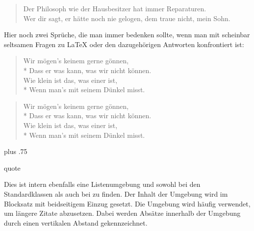 \begin{Example}
\begin{lstcode}
  \begin{verse}
    Der Philosoph wie der Hausbesitzer
    hat immer Reparaturen.\\
    \bigskip
    Wer dir sagt, er hätte noch nie
    gelogen, dem traue nicht, mein Sohn.
  \end{verse}
\end{lstcode}
      \iftrue%
        Hier noch zwei Sprüche, die man immer bedenken sollte, wenn man mit
        scheinbar seltsamen Fragen zu {\LaTeX} oder den dazugehörigen Antworten
        konfrontiert ist:
\begin{lstcode}
  \begin{verse}
    Wir mögen's keinem gerne gönnen,\\*
    Dass er was kann, was wir nicht können.\\
    \bigskip
    Wie klein ist das, was einer ist,\\*
    Wenn man's mit seinem Dünkel misst.
  \end{verse}
\end{lstcode}
        \begin{ShowOutput}
          \begin{verse}
            Wir mögen's keinem gerne gönnen,\\*
            Dass er was kann, was wir nicht können.\\
            \bigskip
            Wie klein ist das, was einer ist,\\*
            Wenn man's mit seinem Dünkel misst.
          \end{verse}
        \end{ShowOutput}
      \fi %
      %
    \end{Example}%
    \ht\strutbox plus .75\strutbox%
  \fi
  \EndIndexGroup


  \iffalse%
    \begin{Declaration}
      \begin{Environment}{quote}\end{Environment}
    \end{Declaration}%
    Dies ist
    intern ebenfalls eine Listenumgebung und sowohl bei den Standardklassen als auch bei
    {\KOMAScript} zu finden. Der Inhalt der Umgebung wird im Blocksatz mit
    beidseitigem Einzug gesetzt. Die Umgebung wird häufig verwendet, um
    längere Zitate abzusetzen. Dabei werden Absätze innerhalb der
    Umgebung durch einen vertikalen Abstand gekennzeichnet.%
    \EndIndexGroup

